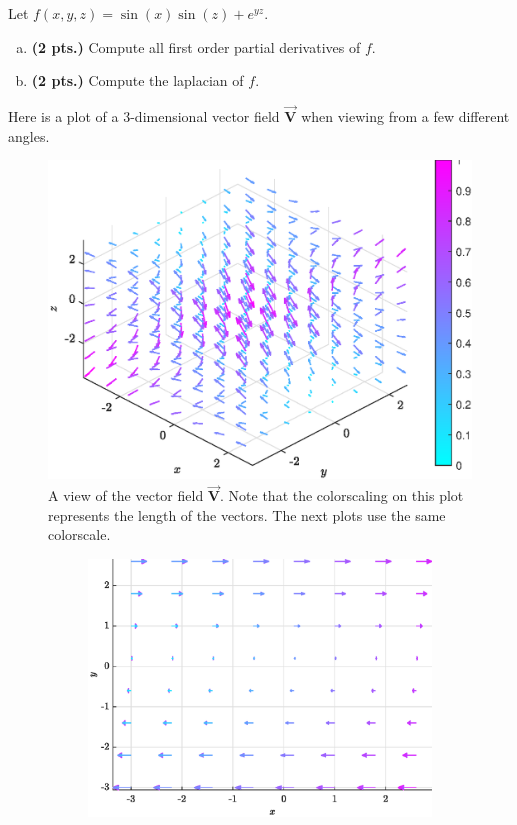\documentclass[12pt]{amsbook}
\newcommand{\vecfieldV}{\boldsymbol{\vec{V}}}
\begin{document}
\begin{problem}
    Let $f(x,y,z) = \sin(x)\sin(z)+e^{yz}$.
    \begin{enumerate}[(a)]
        \item \textbf{(2 pts.)} Compute all first order partial derivatives of $f$.
        \item \textbf{(2 pts.)} Compute the laplacian of $f$.
    \end{enumerate}
\end{problem}

\newpage


\begin{problem}
Here is a plot of a 3-dimensional vector field $\vecfieldV$ when viewing from a few different angles.
\begin{figure}[H]
    \centering
    \includegraphics[width=.85\textwidth]{figures/vecfield}
    \caption{A view of the vector field $\vecfieldV$. Note that the colorscaling on this plot represents the length of the vectors. The next plots use the same colorscale.}
\end{figure}
\begin{figure}[H]
    \centering
    \begin{subfigure}[b]{0.45\textwidth}
        \centering
        \includegraphics[width=\textwidth]{figures/vecfield_xy}

\end{subfigure}
\end{figure}
\end{problem}
\end{document}
